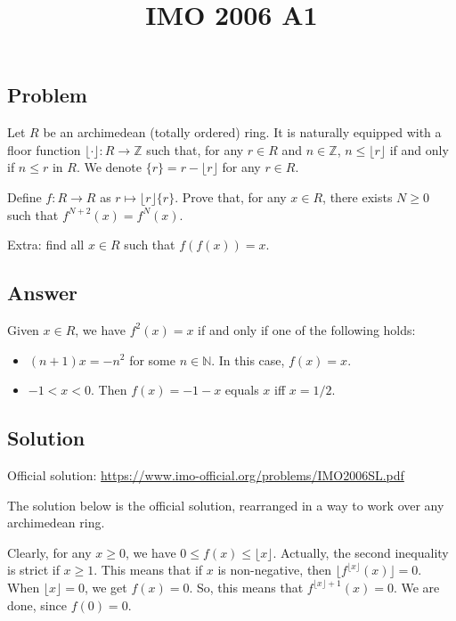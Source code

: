 \documentclass{article}
\title{IMO 2006 A1}
\author{}
\date{}
\newcommand{\Z}{\mathbb{Z}}
\newcommand{\N}{\mathbb{N}}
\begin{document}
\maketitle



\subsection*{Problem}

Let $R$ be an archimedean (totally ordered) ring.
It is naturally equipped with a floor function $\lfloor \cdot \rfloor : R \to \Z$ such that, for any $r \in R$ and $n \in \Z$, $n \leq \lfloor r \rfloor$ if and only if $n \leq r$ in $R$.
We denote $\{r\} = r - \lfloor r \rfloor$ for any $r \in R$.

Define $f : R \to R$ as $r \mapsto \lfloor r \rfloor \{r\}$.
Prove that, for any $x \in R$, there exists $N \geq 0$ such that $f^{N + 2}(x) = f^N(x)$.

Extra: find all $x \in R$ such that $f(f(x)) = x$.



\subsection*{Answer}

Given $x \in R$, we have $f^2(x) = x$ if and only if one of the following holds:
\begin{itemize}
    
    \item
    $(n + 1) x = -n^2$ for some $n \in \N$.
    In this case, $f(x) = x$.

    \item
    $-1 < x < 0$.
    Then $f(x) = -1 - x$ equals $x$ iff $x = 1/2$.

\end{itemize}



\subsection*{Solution}

Official solution: \url{https://www.imo-official.org/problems/IMO2006SL.pdf}

The solution below is the official solution, rearranged in a way to work over any archimedean ring.

Clearly, for any $x \geq 0$, we have $0 \leq f(x) \leq \lfloor x \rfloor$.
Actually, the second inequality is strict if $x \geq 1$.
This means that if $x$ is non-negative, then $\lfloor f^{\lfloor x \rfloor}(x) \rfloor = 0$.
When $\lfloor x \rfloor = 0$, we get $f(x) = 0$.
So, this means that $f^{\lfloor x \rfloor + 1}(x) = 0$.
We are done, since $f(0) = 0$.
\end{document}
